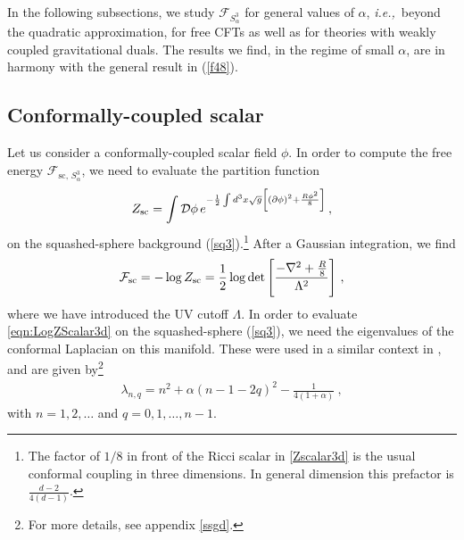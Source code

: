\documentclass[12pt]{article}
\numberwithin{equation}{section}
\newcommand{\req}[1]{(\ref{#1})} %
\newcommand{\ie}{{\it i.e.,}\ }
\begin{document}
In the following subsections, we study $\mathcal{F}_{S^{3}_{\alpha}}$ for general values of $\alpha$, \ie beyond the quadratic approximation, for free CFTs as well as for theories with weakly coupled gravitational duals. The results we find, in the regime of small $\alpha$, are in harmony with the general result in \req{f48}. 

\subsection{Conformally-coupled scalar}
\label{ffc}  

Let us consider a conformally-coupled scalar field $\phi$. In order to compute the free energy $\mathcal{F}_{\textrm{sc},\,  S^3_{\alpha}}$, we need to evaluate the partition function 
%
\begin{align}\label{Zscalar3d}
Z_{\rm sc}=\int \mathcal{D} \phi\, e^{-\frac{1}{2}\int d^3x \sqrt{g} \left[ (\partial \phi)^2 +\frac{ R\phi^2}{8} \right]} \, ,
\end{align}
%
on the squashed-sphere background \req{sq3}.\footnote{The factor of $1/8$ in front of the Ricci scalar in \eqref{Zscalar3d} is the usual conformal coupling in three dimensions. In general dimension this prefactor is $\frac{d-2}{4(d-1)}$.} After a Gaussian integration, we find
%
\begin{align}
\mathcal{F}_{\rm{sc}}=- \log Z_{\rm{sc}}=\frac{1}{2}\log \textrm{det}\left[ \frac{-\nabla^2 +\frac{R}{8}}{ \Lambda^2}\right]\, , \label{eqn:LogZScalar3d}
\end{align}
%
where we have introduced the UV cutoff $\Lambda$. In order to evaluate \eqref{eqn:LogZScalar3d} on the squashed-sphere \req{sq3}, we need the eigenvalues of the conformal Laplacian on this manifold. These were used in a similar context in \cite{Dowker:1998pi,Anninos:2012ft}, and are given by\footnote{For more details, see appendix \ref{ssgd}.}
%
\begin{align}
\lambda_{n,q}= n^2 + \alpha (n-1-2q)^2 - \frac{1}{4(1+\alpha)} \ ,
\end{align}
%
with $n=1,2,\ldots $ and $q=0,1,\ldots,n-1$.
\end{document}
